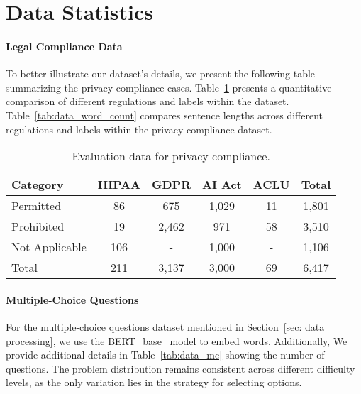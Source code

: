 \section{Data Statistics}
\label{app:stat}
\paragraph{Legal Compliance Data}
To better illustrate our dataset's details, we present the following table summarizing the privacy compliance cases. Table~\ref{tab:data_cases} presents a quantitative comparison of different regulations and labels within the dataset. Table~\ref{tab:data_word_count} compares sentence lengths across different regulations and labels within the privacy compliance dataset.



\begin{table}[h]
\small
        \centering
        \renewcommand{\arraystretch}{1.2}
        \setlength{\tabcolsep}{2pt}  
        \begin{tabular}{l|c|c|c|c|c}
            \toprule
            \textbf{Category} & \textbf{HIPAA} & \textbf{GDPR} & \textbf{AI Act} & \textbf{ACLU} & \textbf{Total} \\
            \midrule
            Permitted & 86 & 675 & 1,029 & 11 & 1,801 \\
            Prohibited & 19 & 2,462 & 971 & 58 & 3,510 \\
            Not Applicable & 106 & - & 1,000 & - & 1,106 \\
            \midrule
            Total & 211 & 3,137 & 3,000 & 69 & 6,417 \\
            \bottomrule
        \end{tabular}
        \vspace{-0.1in}
        \caption{Evaluation data for privacy compliance.}
        \label{tab:data_cases}
        \vspace{-0.15in}
\end{table}


\paragraph{Multiple-Choice Questions}
For the multiple-choice questions dataset mentioned in Section~\ref{sec: data processing}, we use the BERT\_base~\cite{bert} model to embed words. Additionally, We provide additional details in Table~\ref{tab:data_mc} showing the number of questions. The problem distribution remains consistent across different difficulty levels, as the only variation lies in the strategy for selecting options.


